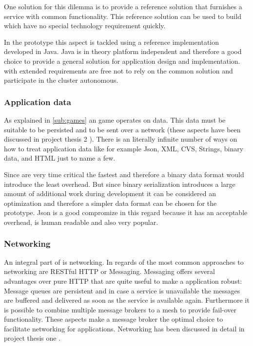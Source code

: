 One solution for this dilemma is to provide a reference solution that furnishes
a service with common functionality. This reference solution can be used to
build \mss{} which have no special technology requirement quickly.

In the prototype this aspect is tackled using a reference implementation
developed in Java. Java is in theory platform independent and therefore a good
choice to provide a general solution for \mss{} application design and
implementation. \mss{} with extended requirements are free not to rely on the
common solution and participate in the cluster autonomous.

\subsubsection{Application data}

As explained in \autoref{sub:games} an \og{} game operates on data. This data
must be suitable to be persisted and to be sent over a network (these aspects
have been discussed in project thesis 2 ). There is an literally
infinite number of ways on how to treat application data like for example Json,
XML, CVS, Strings, binary data, and HTML just to name a few.

Since \ogs{} are very time critical the fastest and therefore a binary data
format would introduce the least overhead. But since binary serialization
introduces a large amount of additional work during development it can be
considered an optimization\cite{gafferon2017games} and therefore a simpler data
format can be chosen for the prototype. Json is a good compromize in this regard
because it has an acceptable overhead, is human readable and also very popular.

\subsubsection{Networking}

An integral part of \ogs{} is networking. In regards of \mss{} the most common
approaches to networking are RESTful HTTP or Messaging. Messaging offers
several advantages over pure HTTP that are quite useful to make a \ms{}
application robust: Message queues are persistent and in case a service is
unavailable the messages are buffered and delivered as soon as the service
is available again. Furthermore it is possible to combine multiple message
brokers to a mesh to provide fail-over functionality. These aspects make a
message broker the optimal choice to facilitate networking for \ms{} \og{}
applications. Networking has been discussed in detail in project thesis one
.

